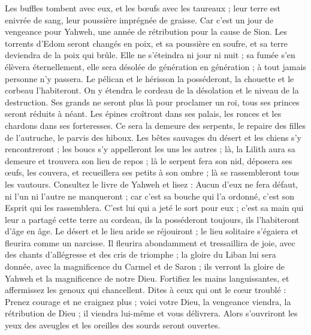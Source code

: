 \begin{multicols}{2}
Les buffles tombent avec eux, et les bœufs avec les taureaux ; leur terre est enivrée de sang, leur poussière imprégnée de graisse.
Car c'est un jour de vengeance pour Yahweh, une année de rétribution pour la cause de Sion.
Les torrents d'Edom seront changés en poix, et sa poussière en soufre, et sa terre deviendra de la poix qui brûle.
Elle ne s'éteindra ni jour ni nuit ; sa fumée s'en élèvera éternellement, elle sera désolée de génération en génération ; à tout jamais personne n'y passera.
Le pélican et le hérisson la posséderont, la chouette et le corbeau l'habiteront. On y étendra le cordeau de la désolation et le niveau de la destruction.
Ses grands ne seront plus là pour proclamer un roi, tous ses princes seront réduits à néant.
Les épines croîtront dans ses palais, les ronces et les chardons dans ses forteresses. Ce sera la demeure des serpents, le repaire des filles de l'autruche, le parvis des hiboux.
Les bêtes sauvages du désert et les chiens s'y rencontreront ; les boucs s'y appelleront les uns les autres ; là, la Lilith aura sa demeure et trouvera son lieu de repos ;
là le serpent fera son nid, déposera ses œufs, les couvera, et recueillera ses petits à son ombre ; là se rassembleront tous les vautours.
Consultez le livre de Yahweh et lisez : Aucun d'eux ne fera défaut, ni l'un ni l'autre ne manqueront ; car c'est sa bouche qui l'a ordonné, c'est son Esprit qui les rassemblera.
C'est lui qui a jeté le sort pour eux ; c'est sa main qui leur a partagé cette terre au cordeau, ils la posséderont toujours, ils l'habiteront d'âge en âge.
\VerseOne{}Le désert et le lieu aride se réjouiront ; le lieu solitaire s'égaiera et fleurira comme un narcisse.
Il fleurira abondamment et tressaillira de joie, avec des chants d'allégresse et des cris de triomphe ; la gloire du Liban lui sera donnée, avec la magnificence du Carmel et de Saron ; ils verront la gloire de Yahweh et la magnificence de notre Dieu.
Fortifiez les mains languissantes, et affermissez les genoux qui chancellent.
Dites à ceux qui ont le cœur troublé : Prenez courage et ne craignez plus ; voici votre Dieu, la vengeance viendra, la rétribution de Dieu ; il viendra lui-même et vous délivrera.
Alors s'ouvriront les yeux des aveugles et les oreilles des sourds seront ouvertes.

\end{multicols}
